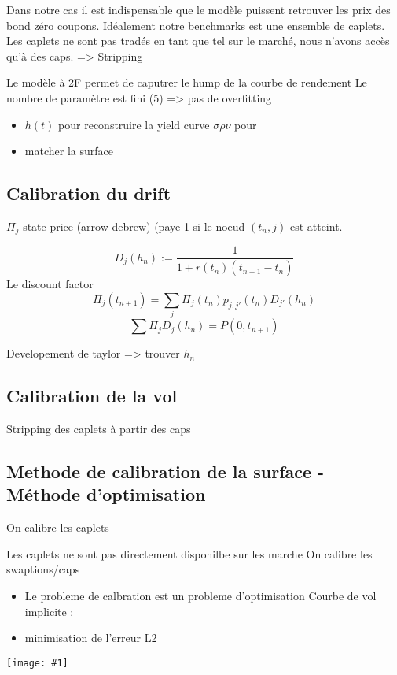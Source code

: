 \documentclass[paper=a4, fontsize=11pt]{scrartcl}
\numberwithin{equation}{section}		%
\numberwithin{figure}{section}			%
\numberwithin{table}{section}				%
\theoremstyle{definition}
\newcommand{\IMG}[3]{
  \begin{center}
    \texttt{[image: \#1]}%
    \end{center}
}
\begin{document}
Dans notre cas il est indispensable que le modèle puissent retrouver les prix des bond zéro coupons.
Idéalement notre benchmarks est une ensemble de caplets. Les caplets ne sont pas tradés en tant que tel sur le marché, nous n'avons accès qu'à des caps. => Stripping

Le modèle à 2F permet de caputrer le hump de la courbe de rendement
Le nombre de paramètre est fini (5) => pas de overfitting


\begin{itemize}
\item $h(t)$ pour reconstruire la yield curve $\sigma \rho \nu$ pour
\item  matcher la surface
\end{itemize}

\subsection{Calibration du drift}

$\Pi_j$ state price (arrow debrew) (paye 1 si le noeud $(t_n, j)$ est atteint.

$$D_j(h_n) := \frac{1}{1 + r(t_n)(t_{n+1} - t_n)} $$ Le discount factor
$$ \Pi_j(t_{n+1}) = \sum_j \Pi_j(t_n) p_{j, j'}(t_n) D_{j'}(h_n)$$
$$ \sum \Pi_j D_j(h_n) = P(0, t_{n+1}) $$

Developement de taylor => trouver $h_n$
\subsection{ Calibration de la vol}
Stripping des caplets à partir des caps


\subsection{Methode de calibration de la surface - Méthode d'optimisation}

On calibre les caplets

Les caplets ne sont pas directement disponilbe sur les marche
On calibre les swaptions/caps

\begin{itemize}
\item Le probleme de calbration est un probleme d'optimisation Courbe
  de vol implicite :
\item minimisation de l'erreur L2
\end{itemize}
\IMG{img/capsurf.png}{Cap surface}{0.5}

%
\end{document}
